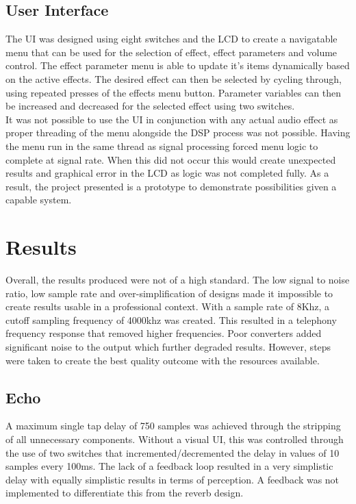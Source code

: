 \documentclass[titlepage]{scrartcl}
\begin{document}
    \subsection{User Interface}
    The UI was designed using eight switches and the LCD to create a
    navigatable menu that can be used for the selection of effect, effect
    parameters and volume control. The effect parameter menu is able to update
    it's items dynamically based on the active effects. The desired effect can
    then be selected by cycling through, using repeated presses of the effects
    menu button. Parameter variables can then be increased and decreased for
    the selected effect using two switches.\\
    It was not possible to use the UI in conjunction with any actual audio
    effect as proper threading of the menu alongside the DSP process was not
    possible. Having the menu run in the same thread as signal processing
    forced menu logic to complete at signal rate. When this did not occur this
    would create unexpected results and graphical error in the LCD as logic was
    not completed fully. As a result, the project presented is a prototype to
    demonstrate possibilities given a capable system.

    \section{Results}
    Overall, the results produced were not of a high standard. The low signal
    to noise ratio, low sample rate and over-simplification of designs made it
    impossible to create results usable in a professional context. With a
    sample rate of 8Khz, a cutoff sampling frequency of 4000khz was created.
    This resulted in a telephony frequency response that removed higher
    frequencies. Poor converters added significant noise to the output which
    further degraded results. However, steps were taken to create the best
    quality outcome with the resources available.

        \subsection{Echo}
        A maximum single tap delay of 750 samples was achieved through the
        stripping of all unnecessary components. Without a visual UI,
        this was controlled through the use of two switches that
        incremented/decremented the delay in values of 10 samples every 100ms. 
        The lack of a feedback loop resulted in a very simplistic delay with
        equally simplistic results in terms of perception. A feedback was not
        implemented to differentiate this from the reverb design.
\end{document}
